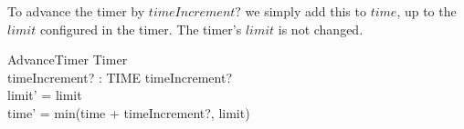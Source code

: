 \documentclass{article}
\begin{document}
\pagestyle{empty}
\noindent
To advance the timer by $timeIncrement?$ we simply add this to $time$,
up to the $limit$ configured in the timer.  The timer's $limit$ is not
changed.

\begin{schema}{AdvanceTimer}
  \Delta Timer\\
  timeIncrement? : TIME
 \leq timeIncrement? \\
  limit' = limit\\
  time' = min(time + timeIncrement?, limit)
\end{schema}
\end{document}
